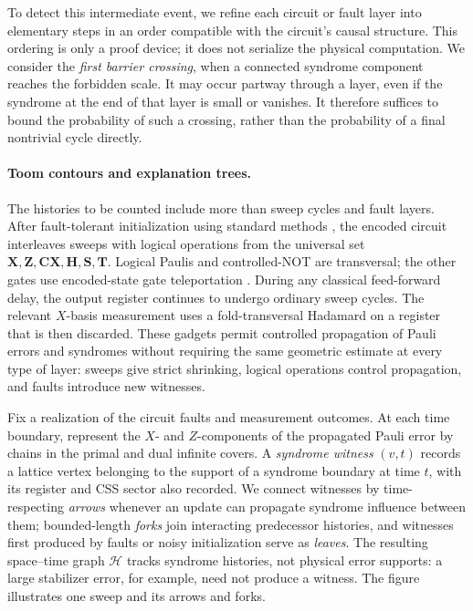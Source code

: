 To detect this intermediate event, we refine each circuit or fault layer into elementary steps in an order compatible with the circuit's causal structure. This ordering is only a proof device; it does not serialize the physical computation. We consider the \emph{first barrier crossing}, when a connected syndrome component reaches the forbidden scale. It may occur partway through a layer, even if the syndrome at the end of that layer is small or vanishes. It therefore suffices to bound the probability of such a crossing, rather than the probability of a final nontrivial cycle directly.

\paragraph{Toom contours and explanation trees.}
The histories to be counted include more than sweep cycles and fault layers. After fault-tolerant initialization using standard methods \cite{aharonov1999faulttolerant,gottesman2014faulttolerant,grospellier:tel-03364419}, the encoded circuit interleaves sweeps with logical operations from the universal set $\mathbf X,\mathbf Z,\mathbf{CX},\mathbf H,\mathbf S,\mathbf T$. Logical Paulis and controlled-NOT are transversal; the other gates use encoded-state gate teleportation \cite{Zhou_2000}. During any classical feed-forward delay, the output register continues to undergo ordinary sweep cycles. The relevant $X$-basis measurement uses a fold-transversal Hadamard \cite{Breuckmann_2024} on a register that is then discarded. These gadgets permit controlled propagation of Pauli errors and syndromes without requiring the same geometric estimate at every type of layer: sweeps give strict shrinking, logical operations control propagation, and faults introduce new witnesses.

Fix a realization of the circuit faults and measurement outcomes. At each time boundary, represent the $X$- and $Z$-components of the propagated Pauli error by chains in the primal and dual infinite covers. A \emph{syndrome witness} $(v,t)$ records a lattice vertex belonging to the support of a syndrome boundary at time $t$, with its register and CSS sector also recorded. We connect witnesses by time-respecting \emph{arrows} whenever an update can propagate syndrome influence between them; bounded-length \emph{forks} join interacting predecessor histories, and witnesses first produced by faults or noisy initialization serve as \emph{leaves}. The resulting space--time graph $\mathcal H$ tracks syndrome histories, not physical error supports: a large stabilizer error, for example, need not produce a witness. The figure illustrates one sweep and its arrows and forks.

